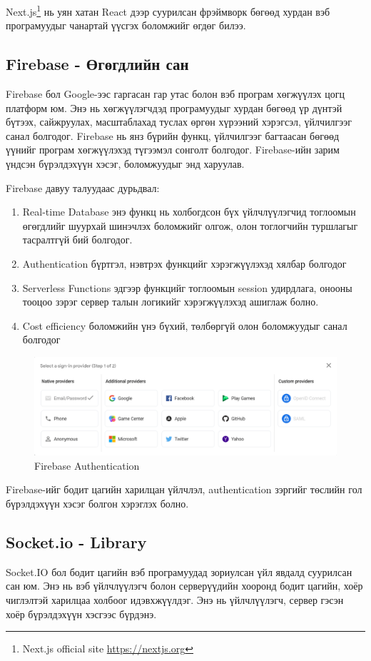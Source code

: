 Next.js\footnote{Next.js official site \url{https://nextjs.org}} нь уян хатан React дээр суурилсан фрэймворк бөгөөд хурдан вэб програмуудыг чанартай үүсгэх боломжийг өгдөг билээ. 


\subsection{Firebase - Өгөгдлийн сан}

Firebase бол Google-ээс гаргасан гар утас болон вэб програм хөгжүүлэх цогц платформ юм. Энэ нь хөгжүүлэгчдэд програмуудыг хурдан бөгөөд үр дүнтэй бүтээх, сайжруулах, масштаблахад туслах өргөн хүрээний хэрэгсэл, үйлчилгээг санал болгодог. Firebase нь янз бүрийн функц, үйлчилгээг багтаасан бөгөөд үүнийг програм хөгжүүлэхэд түгээмэл сонголт болгодог. Firebase-ийн зарим үндсэн бүрэлдэхүүн хэсэг, боломжуудыг энд харуулав.


Firebase давуу талуудаас дурьдвал:
\begin{enumerate}
	\item Real-time Database энэ функц нь холбогдсон бүх үйлчлүүлэгчид тоглоомын өгөгдлийг шуурхай шинэчлэх боломжийг олгож, олон тоглогчийн туршлагыг тасралтгүй бий болгодог.
	\item Authentication бүртгэл, нэвтрэх функцийг хэрэгжүүлэхэд хялбар болгодог
	\item Serverless Functions эдгээр функцийг тоглоомын session удирдлага, онооны тооцоо зэрэг сервер талын логикийг хэрэгжүүлэхэд ашиглаж болно.
	\item Cost efficiency боломжийн үнэ бүхий, төлбөргүй олон боломжуудыг санал болгодог
\end{enumerate}

\begin{figure}[h]
	\centering
	\includegraphics[width=15cm]{images/firebase_auth.png}
	\caption{Firebase Authentication}
	\label{fig:prisma}
\end{figure}

Firebase-ийг бодит цагийн харилцан үйлчлэл, authentication зэргийг төслийн гол бүрэлдэхүүн хэсэг болгон хэрэглэх болно.

\subsection{Socket.io - Library}

Socket.IO бол бодит цагийн вэб програмуудад зориулсан үйл явдалд суурилсан сан юм. Энэ нь вэб үйлчлүүлэгч болон серверүүдийн хооронд бодит цагийн, хоёр чиглэлтэй харилцаа холбоог идэвхжүүлдэг. Энэ нь үйлчлүүлэгч, сервер гэсэн хоёр бүрэлдэхүүн хэсгээс бүрдэнэ.